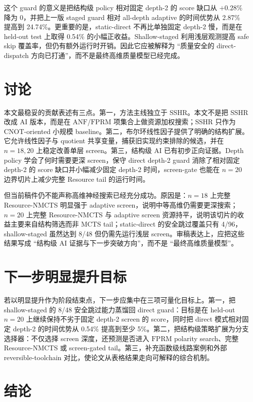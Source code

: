 \documentclass[UTF8,fontset=macnew,11pt]{ctexart}
\newcommand{\method}{Resource-NMCTS}
\newcommand{\anf}{\ensuremath{\mathrm{ANF}}}
\newcommand{\fprm}{\ensuremath{\mathrm{FPRM}}}
\begin{document}
这个 guard 的意义是把结构级 policy 相对固定 depth-2 的 score 缺口从 $+0.28\%$ 降为 $0$，并把上一版 staged guard 相对 all-depth adaptive 的时间优势从 2.87\% 提高到 24.74\%。更重要的是，static-direct 不再比单独固定 depth-2 慢，而是在 held-out test 上取得 0.54\% 的小幅正收益。Shallow-staged 利用浅层观测提高 safe skip 覆盖率，但仍有额外运行时开销。因此它应被解释为 ``质量安全的 direct-dispatch 方向已打通''，而不是最终高维质量模型已经完成。

\section{讨论}

本文最稳妥的贡献表述有三点。第一，方法主线独立于 SSHR。本文不是把 SSHR 改成 AI 版本，而是在 \anf{}/\fprm{} 项集合上做资源加权搜索；SSHR 只作为 CNOT-oriented 小规模 baseline。第二，布尔环线性因子提供了明确的结构扩展。它允许线性因子与 quotient 共享变量，捕获旧实现约束排除的候选，并在 $n=18,20$ 上稳定改善单层 screen。第三，结构级 AI 已有初步正向证据。Depth policy 学会了何时需要更深 screen，保守 direct depth-2 guard 消除了相对固定 depth-2 的 score 缺口并小幅减少固定 depth-2 时间，screen-gate 也能在 $n=20$ 边界切片上减少完整 Resource tail 的运行时间。

但当前稿件仍不能声称高维神经搜索已经充分成功。原因是：$n=18$ 上完整 \method{} 明显强于 adaptive screen，说明中等高维仍需要更深搜索；$n=20$ 上完整 \method{} 与 adaptive screen 资源持平，说明该切片的收益主要来自结构筛选而非 MCTS tail；static-direct 的安全跳过覆盖只有 4/96，shallow-staged 虽然达到 8/48 但仍需先运行浅层 screen。审稿表达上，应把这些结果写成 ``结构级 AI 证据与下一步突破方向''，而不是 ``最终高维质量模型''。

\section{下一步明显提升目标}

若以明显提升作为阶段结束点，下一步应集中在三项可量化目标上。第一，把 shallow-staged 的 8/48 安全跳过能力蒸馏回 direct guard：目标是在 held-out $n=20$ 上继续保持不劣于固定 depth-2 screen 的 score，同时把 direct 模式相对固定 depth-2 的时间优势从 0.54\% 提高到至少 5\%。第二，把结构级策略扩展为分支选择器：不仅选择 screen 深度，还预测是否进入 \fprm{} polarity search、完整 \method{} 或 screen-gated tail。第三，补充函数级线路案例和外部 reversible-toolchain 对比，使论文从表格结果走向可解释的综合机制。

\section{结论}
\end{document}
